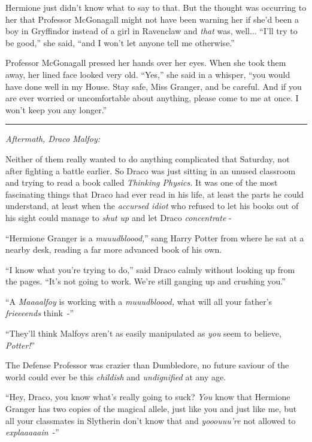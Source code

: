 Hermione just didn't know what to say to that. But the thought was occurring to her that Professor McGonagall might not have been warning her if she'd been a boy in Gryffindor instead of a girl in Ravenclaw and \emph{that} was, well... ``I'll try to be good,'' she said, ``and I won't let anyone tell me otherwise.''

Professor McGonagall pressed her hands over her eyes. When she took them away, her lined face looked very old. ``Yes,'' she said in a whisper, ``you would have done well in my House. Stay safe, Miss Granger, and be careful. And if you are ever worried or uncomfortable about anything, please come to me at once. I won't keep you any longer.''

\begin{center}\rule{3in}{0.4pt}\end{center}

\emph{Aftermath, Draco Malfoy:}

Neither of them really wanted to do anything complicated that Saturday, not after fighting a battle earlier. So Draco was just sitting in an unused classroom and trying to read a book called \emph{Thinking Physics.} It was one of the most fascinating things that Draco had ever read in his life, at least the parts he could understand, at least when the \emph{accursed idiot} who refused to let his books out of his sight could manage to \emph{shut up} and let Draco \emph{concentrate} -

``Hermione Granger is a \emph{muuudbloood,}'' sang Harry Potter from where he sat at a nearby desk, reading a far more advanced book of his own.

``I know what you're trying to do,'' said Draco calmly without looking up from the pages. ``It's not going to work. We're still ganging up and crushing you.''

``A \emph{Maaaalfoy} is working with a \emph{muuudbloood,} what will all your father's \emph{frieeeends} think~-''

``They'll think Malfoys aren't as easily manipulated as \emph{you} seem to believe, \emph{Potter!}''

The Defense Professor was crazier than Dumbledore, no future saviour of the world could ever be this \emph{childish} and \emph{undignified} at any age.

``Hey, Draco, you know what's really going to suck? \emph{You} know that Hermione Granger has two copies of the magical allele, just like you and just like me, but all your classmates in Slytherin don't know that and \emph{yooouuu're} not allowed to \emph{explaaaaain}~-''

